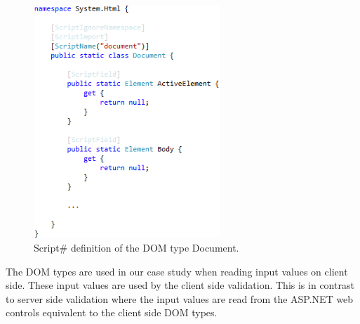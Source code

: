 		\begin{figure}[H]
				\includegraphics[width=7cm]{resources/images/Document.png}
			\caption{Script\# definition of the DOM type Document.}
			\label{fig:document}
		\end{figure}

		The DOM types are used in our case study when reading input values on client side. These input values are used by the client side validation. This is in contrast to server side validation where the input values are read from the ASP.NET web controls equivalent to the client side DOM types.

